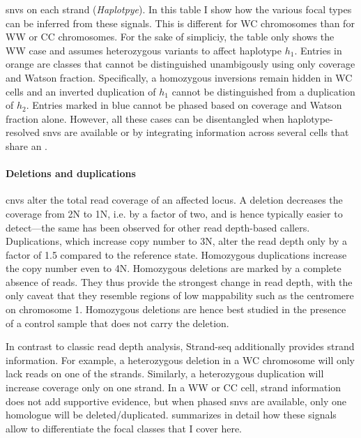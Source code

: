 \begin{table}[t]
{    \acp{snv} on each strand (\emph{Haplotpye}). In this table I show how the
    various focal \sv types can be inferred from these signals. This is different
    for WC chromosomes than for WW or CC chromosomes. For the sake of simpliciy,
    the table only shows the WW case and assumes heterozygous variants to affect
    haplotype $h_1$. Entries in orange are \sv classes that cannot be
    distinguished unambigously using only coverage and Watson fraction.
    Specifically, a homozygous inversions remain hidden in WC cells and an
    inverted duplication of $h_1$ cannot be distinguished from a duplication of
    $h_2$. Entries marked in blue cannot be phased based on coverage and Watson
    fraction alone. However, all these cases can be disentangled when
    haplotype-resolved \acp{snv} are available or by integrating information
    across several cells that share an \sv.}
\end{table}

\paragraph{Deletions and duplications}
\Acp{cnv} alter the total read coverage of an affected locus. A deletion
decreases the coverage from 2N to 1N, i.e. by a factor of two, and is hence
typically easier to detect---the same has been observed for other read
depth-based \sv callers. Duplications, which increase copy number to 3N, alter
the read depth only by a factor of 1.5 compared to the reference state.
Homozygous duplications increase the copy number even to 4N. Homozygous
deletions are marked by a complete absence of reads. They thus provide the
strongest change in read depth, with the only caveat that they resemble regions
of low mappability such as the centromere on chromosome 1. Homozygous deletions
are hence best studied in the presence of a control sample that does not carry
the deletion.

In contrast to classic read depth analysis, Strand-seq additionally provides
strand information. For example, a heterozygous deletion in a WC chromosome will
only lack reads on one of the strands. Similarly, a heterozygous duplication
will increase coverage only on one strand. In a WW or CC cell, strand
information does not add supportive evidence, but when phased \acp{snv} are
available, only one homologue will be deleted/duplicated.
 summarizes in detail how these signals
allow to differentiate the focal \sv classes that I cover here.


